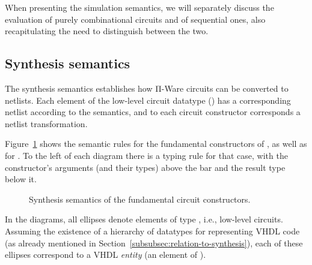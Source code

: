         When presenting the simulation semantics, we will separately discuss the evaluation of
        purely combinational circuits and of sequential ones,
        also recapitulating the need to distinguish between the two.

        \subsection{Synthesis semantics}
        \label{subsec:synthesis-semantics}
            The synthesis semantics establishes how Π-Ware circuits can be converted to netlists.
            Each element of the low-level circuit datatype () has a corresponding netlist
            according to the semantics,
            and to each circuit constructor corresponds a netlist transformation.

            Figure~\ref{fig:semantics-syn-fundamental} shows the semantic rules for the
            fundamental constructors of , as well as for .
            To the left of each diagram there is a typing rule for that case,
            with the constructor's arguments (and their types) above the bar and the result type below it.

            \begin{figure}[ht]
                \caption{Synthesis semantics of the fundamental circuit constructors.\label{fig:semantics-syn-fundamental}}
            \end{figure}

            In the diagrams, all ellipses denote elements of type , i.e., low-level circuits.
            Assuming the existence of a hierarchy of datatypes for representing \ac{VHDL} code
            (as already mentioned in Section~\ref{subsubsec:relation-to-synthesis}),
            each of these ellipses correspond to a \ac{VHDL} \emph{entity} (an element of ).

